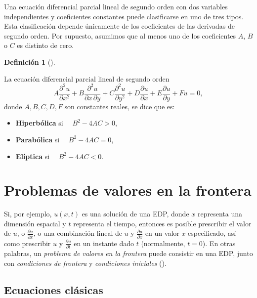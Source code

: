 \documentclass[
  spanish,
  us-letterpaper,
  DIV=11,
  numbers=noendperiod]{scrreprt}
\providecommand{\tightlist}{%
  \setlength{\itemsep}{0pt}\setlength{\parskip}{0pt}}
\theoremstyle{plain}
\theoremstyle{definition}
\newtheorem{definition}{Definición}[chapter]
\theoremstyle{remark}
\begin{document}
Una ecuación diferencial parcial lineal de segundo orden con dos
variables independientes y coeficientes constantes puede clasificarse en
uno de tres tipos. Esta clasificación depende únicamente de los
coeficientes de las derivadas de segundo orden. Por supuesto, asumimos
que al menos uno de los coeficientes \(A\), \(B\) o \(C\) es distinto de
cero.

\begin{definition}[]\protect\hypertarget{def-PDEs-classes}{}\label{def-PDEs-classes}

La ecuación diferencial parcial lineal de segundo orden \[
A \dfrac{\partial^2 u}{\partial x^2} + B \dfrac{\partial^2 u}{\partial x \, \partial y} + C \dfrac{\partial^2 u}{\partial y^2} + D \dfrac{\partial u}{\partial x} + E \dfrac{\partial u}{\partial y} + F u = 0,
\] donde \(A,B,C,D,F\) son constantes reales, se dice que es:

\begin{itemize}
\tightlist
\item
  \textbf{Hiperbólica} si \(\quad B^2-4AC>0\),
\item
  \textbf{Parabólica} si \(\quad B^2-4AC=0\),
\item
  \textbf{Elíptica} si \(\quad B^2-4AC<0\).
\end{itemize}

\end{definition}

\chapter{Problemas de valores en la
frontera}\label{problemas-de-valores-en-la-frontera}

Si, por ejemplo, \(u(x, t)\) es una solución de una EDP, donde \(x\)
representa una dimensión espacial y \(t\) representa el tiempo, entonces
es posible prescribir el valor de \(u\), o
\(\frac{\partial u}{\partial x}\), o una combinación lineal de \(u\) y
\(\frac{\partial u}{\partial x}\) en un valor \(x\) especificado, así
como prescribir \(u\) y \(\frac{\partial u}{\partial t}\) en un instante
dado \(t\) (normalmente, \(t=0\)). En otras palabras, un \emph{problema
de valores en la frontera} puede consistir en una EDP, junto con
\emph{condiciones de frontera} y \emph{condiciones iniciales}
().

\section{Ecuaciones clásicas}\label{ecuaciones-cluxe1sicas}
\end{document}
